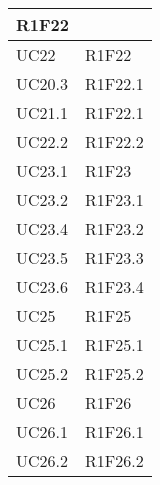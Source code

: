 \begin{center}
\begin{longtable}{|p{44mm}|p{22mm}|}
R1F22 \newline
\\
\hline
UC22 &

R1F22 \newline
\\
\hline
UC20.3 &

R1F22.1 \newline
\\
\hline
UC21.1 &

R1F22.1 \newline
\\
\hline
UC22.2 &

R1F22.2 \newline
\\
\hline
UC23.1 &

R1F23 \newline
\\
\hline
UC23.2 &

R1F23.1 \newline
\\
\hline
UC23.4 &

R1F23.2 \newline
\\
\hline
UC23.5 &

R1F23.3 \newline
\\
\hline
UC23.6 &

R1F23.4 \newline
\\
\hline
UC25 &

R1F25 \newline
\\
\hline
UC25.1 &

R1F25.1 \newline
\\
\hline
UC25.2 &

R1F25.2 \newline
\\
\hline
UC26 &

R1F26 \newline
\\
\hline
UC26.1 &

R1F26.1 \newline
\\
\hline
UC26.2 &

R1F26.2 \newline
\\
\hline

	\end{longtable}
\end{center}

